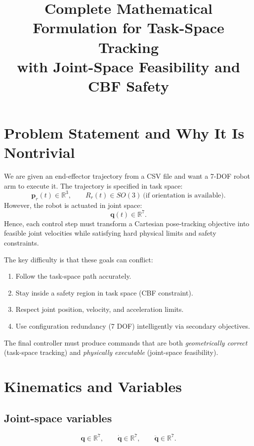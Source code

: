 \documentclass[11pt,a4paper]{article}
\title{Complete Mathematical Formulation for Task-Space Tracking\\with Joint-Space Feasibility and CBF Safety}
\author{}
\date{}
\begin{document}
\maketitle
\tableofcontents
\newpage

\section{Problem Statement and Why It Is Nontrivial}

We are given an end-effector trajectory from a CSV file and want a 7-DOF robot arm to execute it.
The trajectory is specified in task space:
\[
\mathbf{p}_r(t)\in\mathbb{R}^3,\qquad R_r(t)\in SO(3)\ \text{(if orientation is available)}.
\]
However, the robot is actuated in joint space:
\[
\mathbf{q}(t)\in\mathbb{R}^7.
\]
Hence, each control step must transform a Cartesian pose-tracking objective into feasible joint velocities while satisfying hard physical limits and safety constraints.

The key difficulty is that these goals can conflict:
\begin{enumerate}[label=\arabic*.]
\item Follow the task-space path accurately.
\item Stay inside a safety region in task space (CBF constraint).
\item Respect joint position, velocity, and acceleration limits.
\item Use configuration redundancy (7 DOF) intelligently via secondary objectives.
\end{enumerate}

The final controller must produce commands that are both \emph{geometrically correct} (task-space tracking) and \emph{physically executable} (joint-space feasibility).

\section{Kinematics and Variables}

\subsection{Joint-space variables}
\[
\mathbf{q}\in\mathbb{R}^7,\qquad
\dot{\mathbf{q}}\in\mathbb{R}^7,\qquad
\ddot{\mathbf{q}}\in\mathbb{R}^7.
\]
\end{document}
